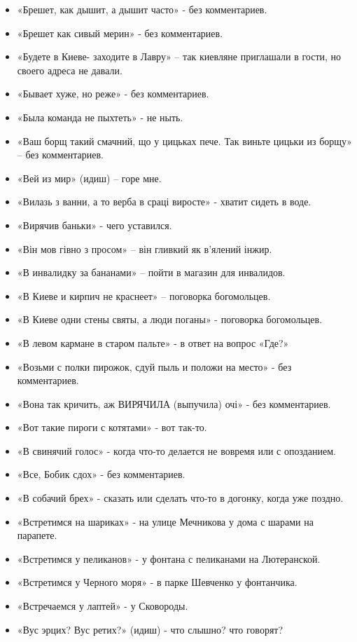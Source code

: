 \begin{itemize}
\item  «Брешет, как дышит, а дышит часто» - без комментариев.
\item  «Брешет как сивый мерин» - без комментариев.
\item  «Будете в Киеве- заходите в Лавру» – так киевляне приглашали в гости, но своего адреса не давали.
\item  «Бывает хуже, но реже» - без комментариев.
\item  «Была команда не пыхтеть» - не ныть.
\item  «Ваш борщ такий смачний, що у цицьках пече. Так виньте цицьки из борщу» – без комментариев.
\item  «Вей из мир» (идиш) – горе мне.
\item  «Вилазь з ванни, а то верба в сраці виросте» - хватит сидеть в воде.
\item  «Вирячив баньки» - чего уставился.
\item  «Він мов гівно з просом» – він гливкий як в’ялений інжир. 
\item  «В инвалидку за бананами» – пойти в магазин для инвалидов.
\item  «В Киеве и кирпич не краснеет» – поговорка богомольцев. 
\item  «В Киеве одни стены святы, а люди поганы» - поговорка богомольцев.
\item  «В левом кармане в старом пальте» - в ответ на вопрос «Где?»
\item  «Возьми с полки пирожок, сдуй пыль и положи на место» - без комментариев.
\item  «Вона так кричить, аж ВИРЯЧИЛА (выпучила) очі» - без комментариев.
\item  «Вот такие пироги с котятами» - вот так-то.
\item  «В свинячий голос» - когда что-то делается не вовремя или с опозданием.
\item  «Все, Бобик сдох» - без комментариев.
\item  «В собачий брех» - сказать или сделать что-то в догонку, когда уже поздно.
\item  «Встретимся на шариках» - на улице Мечникова у дома с шарами на парапете. 
\item  «Встретимся у пеликанов» - у фонтана с пеликанами  на Лютеранской.
\item  «Встретимся у Черного моря» - в парке Шевченко у фонтанчика.
\item  «Встречаемся у лаптей» - у Сковороды.
\item  «Вус эрцих? Вус ретих?» (идиш) - что слышно? что говорят?

\end{itemize}
